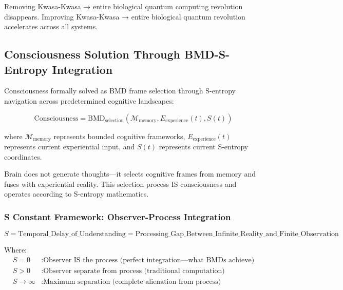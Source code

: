 ﻿\documentclass[11pt,a4paper]{article}
\begin{document}
\begin{theorem}
Removing Kwasa-Kwasa → entire biological quantum computing revolution disappears.
Improving Kwasa-Kwasa → entire biological quantum revolution accelerates across all systems.
\end{theorem}

\subsection{Consciousness Solution Through BMD-S-Entropy Integration}

Consciousness formally solved as BMD frame selection through S-entropy navigation across predetermined cognitive landscapes:

\begin{equation}
\text{Consciousness} = \text{BMD}_{\text{selection}}(\mathcal{M}_{\text{memory}}, E_{\text{experience}}(t), S(t))
\end{equation}

where $\mathcal{M}_{\text{memory}}$ represents bounded cognitive frameworks, $E_{\text{experience}}(t)$ represents current experiential input, and $S(t)$ represents current S-entropy coordinates.

Brain does not generate thoughts—it selects cognitive frames from memory and fuses with experiential reality. This selection process IS consciousness and operates according to S-entropy mathematics.

\subsubsection{S Constant Framework: Observer-Process Integration}

\begin{definition}[S Constant]
\begin{equation}
S = \text{Temporal\_Delay\_of\_Understanding} = \text{Processing\_Gap\_Between\_Infinite\_Reality\_and\_Finite\_Observation}
\end{equation}
\end{definition}

Where:
\begin{align}
S = 0 &: \text{Observer IS the process (perfect integration—what BMDs achieve)} \\
S > 0 &: \text{Observer separate from process (traditional computation)} \\
S \rightarrow \infty &: \text{Maximum separation (complete alienation from process)}
\end{align}
\end{document}
